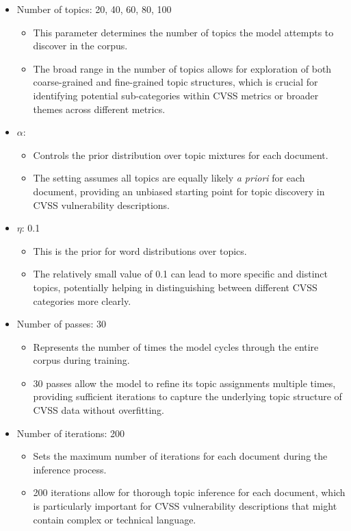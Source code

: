 \begin{itemize}
	\item Number of topics: {20, 40, 60, 80, 100}
	      \begin{itemize}
		      \item This parameter determines the number of topics the model attempts to discover in the corpus.
		      \item The broad range in the number of topics allows for exploration of both coarse-grained and fine-grained topic structures, which is crucial for identifying potential sub-categories within CVSS metrics or broader themes across different metrics.
	      \end{itemize}

	\item $\alpha$: {}
	      \begin{itemize}
		      \item Controls the prior distribution over topic mixtures for each document.
		      \item The  setting assumes all topics are equally likely \textit{a
			            priori} for each document, providing an unbiased starting point for topic discovery in CVSS vulnerability descriptions.
	      \end{itemize}
	\item $\eta$: {0.1}
	      \begin{itemize}
		      \item This is the prior for word distributions over topics.
		      \item The relatively small value of 0.1 can lead to more specific and distinct topics, potentially helping in distinguishing between different CVSS categories more clearly.
	      \end{itemize}
	\item Number of passes: {30}
	      \begin{itemize}
		      \item Represents the number of times the model cycles through the entire corpus during training.
		      \item 30 passes allow the model to refine its topic assignments multiple times, providing sufficient iterations to capture the underlying topic structure of CVSS data without overfitting.
	      \end{itemize}
	\item Number of iterations: {200}
	      \begin{itemize}
		      \item Sets the maximum number of iterations for each document during the inference process.
		      \item 200 iterations allow for thorough topic inference for each document, which is particularly important for CVSS vulnerability descriptions that might contain complex or technical language.
	      \end{itemize}
\end{itemize}

